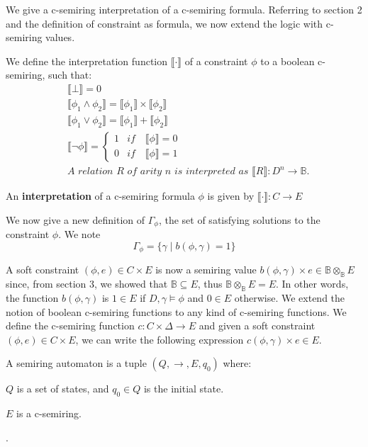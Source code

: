 We give a c-semiring interpretation of a c-semiring formula.
Referring to section 2 and the definition of constraint as formula, we now extend the logic with c-semiring values. 
\begin{definition}
	We define the interpretation function $\llbracket\cdot\rrbracket$ of a constraint $\phi$ to a boolean c-semiring, such that:
	\begin{align*}
		&\llbracket \bot  \rrbracket = 0  \\
		&\llbracket \phi_1 \land \phi_2 \rrbracket = \llbracket \phi_1 \rrbracket \times \llbracket \phi_2 \rrbracket  \\
		&\llbracket \phi_1 \lor \phi_2 \rrbracket = \llbracket \phi_1 \rrbracket + \llbracket \phi_2 \rrbracket 	\\
		&\llbracket \neg \phi \rrbracket = 
		\begin{cases}
		1 &if \quad \llbracket \phi \rrbracket=0  \\ 
		0 &if \quad \llbracket \phi \rrbracket=1
		\end{cases}\\
		&\textit{A relation R of arity n is interpreted as }\llbracket R \rrbracket : D^n \rightarrow \mathbb{B}. 
	\end{align*}
\end{definition}

\begin{definition} An \textbf{interpretation} of a c-semiring formula $\phi$ is given by $\llbracket\cdot\rrbracket : C \rightarrow E $
\end{definition}

We now give a new definition of $\Gamma_{\phi}$, the set of satisfying solutions to the constraint $\phi$. We note $$\Gamma_{\phi} = \{\gamma \mid b(\phi,\gamma)=1\}$$

A soft constraint $(\phi,e) \in C \times E$ is now a semiring value $b(\phi,\gamma) \times e \in \mathbb{B}\otimes_{\mathbb{B}}E$ since, from section 3, we showed that $\mathbb{B} \subseteq E$, thus $ \mathbb{B}\otimes_{\mathbb{B}}E = E$. In other words, the function $b(\phi,\gamma)$ is $1 \in E$ if $D,\gamma \models \phi$ and $0 \in E$ otherwise. We extend the notion of boolean c-semiring functions to any kind of c-semiring functions. We define the c-semiring function $c : C \times \Delta \rightarrow E$ and given a soft constraint $(\phi,e) \in C\times E$, we can write the following expression $c(\phi,\gamma) \times e \in E$.

\begin{definition}
	A semiring automaton is a tuple $(Q,\rightarrow,E, q_0)$ where:
	\begin{list}{-}{ }
		\item $Q$ is a set of states, and $q_0\in Q$ is the initial state.
		\item $E$ is a c-semiring.
		\item .
	\end{list} 
\end{definition}

